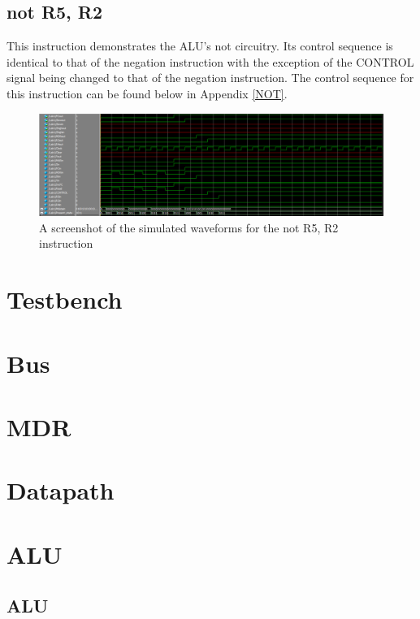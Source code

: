 \documentclass{article}
\begin{document}
    \subsection{not R5, R2}
    This instruction demonstrates the ALU's not circuitry. Its control sequence is identical to that of the negation instruction with the exception of the CONTROL signal being changed to that of the negation instruction. The control sequence for this instruction can be found below in Appendix \ref{NOT}.
    \begin{figure}[h!]
        \begin{center}
            \includegraphics[width=13cm]{not}
            \caption{A screenshot of the simulated waveforms for the not R5, R2 instruction}
        \end{center}
    \end{figure}

\appendix
\section{Testbench} \label{Testbench}
    
\section{Bus} \label{Bus}
    
\section{MDR}\label{MDR}
    
\section{Datapath} \label{Datapath}
    
\section{ALU} \label{ALU}
    \subsection{ALU}
        
\end{document}
